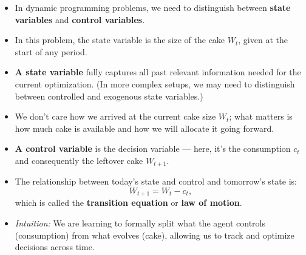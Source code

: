 \documentclass[12pt]{article}
\begin{document}
\begin{itemize}
    \item In dynamic programming problems, we need to distinguish between \textbf{state variables} and \textbf{control variables}.

    \item In this problem, the state variable is the size of the cake \( W_t \), given at the start of any period.

    \item \textbf{A state variable} fully captures all past relevant information needed for the current optimization. 
    (In more complex setups, we may need to distinguish between controlled and exogenous state variables.)

    \item We don't care how we arrived at the current cake size \( W_t \); what matters is how much cake is available and how we will allocate it going forward.

    \item \textbf{A control variable} is the decision variable — here, it's the consumption \( c_t \) and consequently the leftover cake \( W_{t+1} \).

    \item The relationship between today's state and control and tomorrow's state is:
    \[
    W_{t+1} = W_t - c_t,
    \]
    which is called the \textbf{transition equation} or \textbf{law of motion}.

    \item \textit{Intuition:} We are learning to formally split what the agent controls (consumption) from what evolves (cake), allowing us to track and optimize decisions across time.
\end{itemize}
\end{document}
